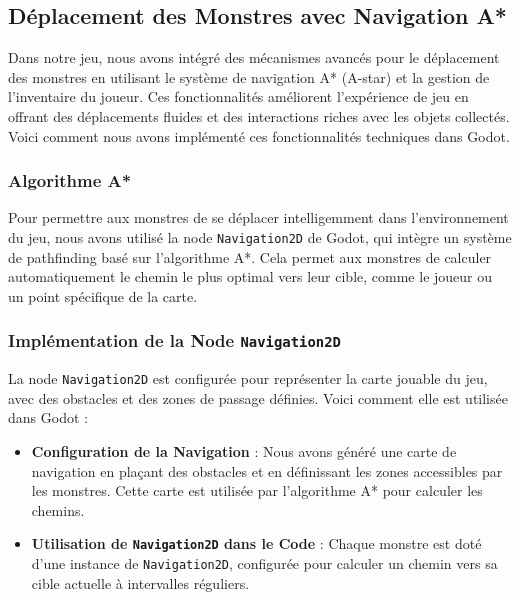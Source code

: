 \subsection{Déplacement des Monstres avec Navigation A*}

Dans notre jeu, nous avons intégré des mécanismes avancés pour le déplacement des monstres en utilisant le système de navigation A* (A-star) et
la gestion de l'inventaire du joueur.
Ces fonctionnalités améliorent l'expérience de jeu en offrant des déplacements fluides et des interactions riches avec les objets collectés. Voici comment nous avons implémenté ces fonctionnalités techniques dans Godot.

\subsubsection{Algorithme A*}

Pour permettre aux monstres de se déplacer intelligemment dans l'environnement du jeu, nous avons utilisé la node \texttt{Navigation2D} de Godot, qui intègre un système de pathfinding basé sur l'algorithme A*.
Cela permet aux monstres de calculer automatiquement le chemin le plus optimal vers leur cible, comme le joueur ou un point spécifique de la carte.

\subsubsection{Implémentation de la Node \texttt{Navigation2D}}

La node \texttt{Navigation2D} est configurée pour représenter la carte jouable du jeu, avec des obstacles et des zones de passage définies. Voici comment elle est utilisée dans Godot :
\\

\begin{itemize}
      \item \textbf{Configuration de la Navigation} :
            Nous avons généré une carte de navigation en plaçant des obstacles et en définissant les zones accessibles par les monstres.
            Cette carte est utilisée par l'algorithme A* pour calculer les chemins.
            \\

      \item \textbf{Utilisation de \texttt{Navigation2D} dans le Code} : Chaque monstre
            est doté d'une instance de \texttt{Navigation2D}, configurée pour calculer un chemin vers sa cible actuelle à intervalles réguliers.
\end{itemize}

